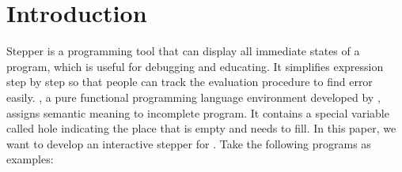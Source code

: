 \section{Introduction}
\label{sec:intro}

Stepper is a programming tool that can display all immediate states of a program, which is useful for debugging and educating. It simplifies expression step by step so that people can track the evaluation procedure to find error easily. \Hazel, a pure functional programming language environment developed by \citet{HazelnutPOPL}, assigns semantic meaning to incomplete program. It contains a special variable called hole indicating the place that is empty and needs to fill. In this paper, we want to develop an interactive stepper for \Hazel. Take the following programs as examples:

